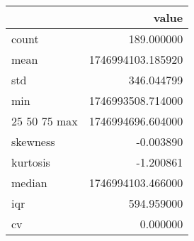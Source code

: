 \begin{tabular}{lr}
\toprule
 & value \\
\midrule
count & 189.000000 \\
mean & 1746994103.185920 \\
std & 346.044799 \\
min & 1746993508.714000 \\
25%
50%
75%
max & 1746994696.604000 \\
skewness & -0.003890 \\
kurtosis & -1.200861 \\
median & 1746994103.466000 \\
iqr & 594.959000 \\
cv & 0.000000 \\
\bottomrule
\end{tabular}

